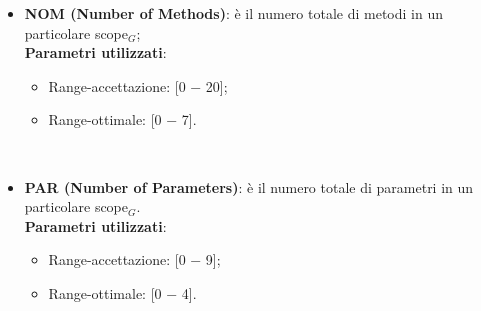 \begin{itemize}
\begin{itemize}
		\item \textbf{NOM (Number of Methods)}: è il numero totale di metodi in un particolare scope$_G$; \\
		
		\textbf{Parametri utilizzati}:
		\begin{itemize}
			\item Range-accettazione: [0 − 20];
			\item Range-ottimale: [0 − 7].
		\end{itemize} \\ \bigskip

		\item \textbf{PAR (Number of Parameters)}: è il numero totale di parametri in un particolare scope$_G$. \\
		
		\textbf{Parametri utilizzati}:
		\begin{itemize}
			\item Range-accettazione: [0 − 9];
			\item Range-ottimale: [0 − 4].
		\end{itemize}
	\end{itemize}
\end{itemize}
